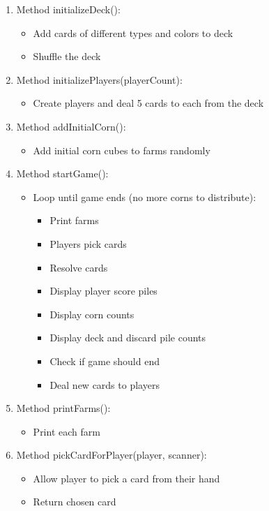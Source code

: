 \documentclass[conference]{IEEEtran}
\begin{document}
\begin{enumerate}
    \item Method initializeDeck():
    \begin{itemize}
        \item Add cards of different types and colors to deck
        \item Shuffle the deck
    \end{itemize}

    \item Method initializePlayers(playerCount):
    \begin{itemize}
        \item Create players and deal 5 cards to each from the deck
    \end{itemize}

    \item Method addInitialCorn():
    \begin{itemize}
        \item Add initial corn cubes to farms randomly
    \end{itemize}

    \item Method startGame():
    \begin{itemize}
        \item Loop until game ends (no more corns to distribute):
        \begin{itemize}
            \item Print farms
            \item Players pick cards
            \item Resolve cards
            \item Display player score piles
            \item Display corn counts
            \item Display deck and discard pile counts
            \item Check if game should end
            \item Deal new cards to players
        \end{itemize}
    \end{itemize}

    \item Method printFarms():
    \begin{itemize}
        \item Print each farm
    \end{itemize}

    \item Method pickCardForPlayer(player, scanner):
    \begin{itemize}
        \item Allow player to pick a card from their hand
        \item Return chosen card
    \end{itemize}


\end{enumerate}
\end{document}
